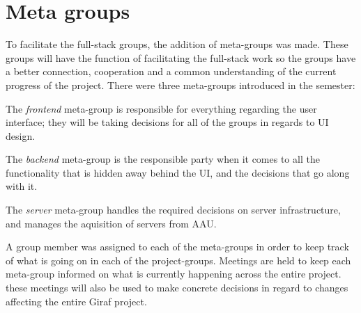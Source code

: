 \section{Meta groups}\label{SUBSEC:MetaGroups}
To facilitate the full-stack groups, the addition of meta-groups was made.
These groups will have the function of facilitating the full-stack work so the groups have a better connection, cooperation and a common understanding of the current progress of the project.
There were three meta-groups introduced in the semester:

The \textit{frontend} meta-group is responsible for everything regarding the user interface; they will be taking decisions for all of the groups in regards to UI design.

The \textit{backend} meta-group is the responsible party when it comes to all the functionality that is hidden away behind the UI, and the decisions that go along with it.

The \textit{server} meta-group handles the required decisions on server infrastructure, and manages the aquisition of servers from AAU.

A group member was assigned to each of the meta-groups in order to keep track of what is going on in each of the project-groups. 
Meetings are held to keep each meta-group informed on what is currently happening across the entire project. 
these meetings will also be used to make concrete decisions in regard to changes affecting the entire Giraf project.
